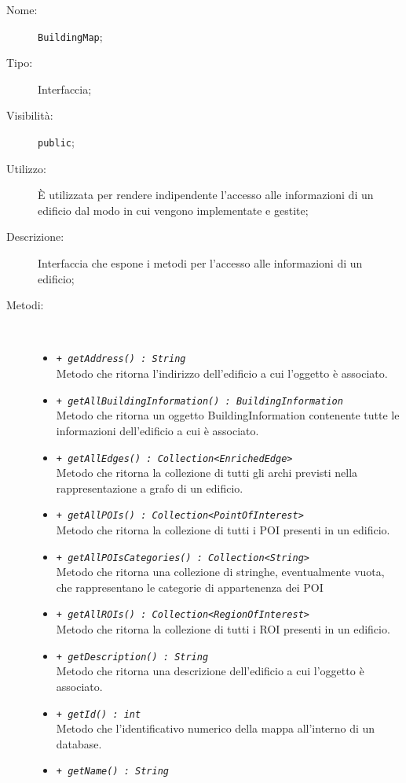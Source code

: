 \documentclass[../DefinizioneDiProdotto.tex]{subfiles}
\begin{document}
    \begin{description}
\item[Nome:] \texttt{BuildingMap};
\item[Tipo:] Interfaccia;
\item[Visibilità:] \texttt{public};
\item[Utilizzo:] È utilizzata per rendere indipendente l'accesso alle informazioni di un edificio dal modo in cui vengono implementate e gestite;
\item[Descrizione:] Interfaccia che espone i metodi per l'accesso alle informazioni di un edificio;
\item[Metodi:] \
\begin{itemize}
\item \texttt{+ \textit{getAddress() : String}}\\
Metodo che ritorna l'indirizzo dell'edificio a cui l'oggetto è associato.
 \item \texttt{+ \textit{getAllBuildingInformation() : BuildingInformation}}\\
Metodo che ritorna un oggetto BuildingInformation contenente tutte le informazioni dell'edificio a cui è associato.
 \item \texttt{+ \textit{getAllEdges() : Collection<EnrichedEdge>}}\\
Metodo che ritorna la collezione di tutti gli archi previsti nella rappresentazione a grafo di un edificio.
 \item \texttt{+ \textit{getAllPOIs() : Collection<PointOfInterest>}}\\
Metodo che ritorna la collezione di tutti i POI presenti in un edificio.
 \item \texttt{+ \textit{getAllPOIsCategories() : Collection<String>}}\\
Metodo che ritorna una collezione di stringhe, eventualmente vuota, che rappresentano le categorie di appartenenza dei POI
 \item \texttt{+ \textit{getAllROIs() : Collection<RegionOfInterest>}}\\
Metodo che ritorna la collezione di tutti i ROI presenti in un edificio.
 \item \texttt{+ \textit{getDescription() : String}}\\
Metodo che ritorna una descrizione dell'edificio a cui l'oggetto è associato.
 \item \texttt{+ \textit{getId() : int}}\\
Metodo che l'identificativo numerico della mappa all'interno di un database.
 \item \texttt{+ \textit{getName() : String}}\\

\end{itemize}
\end{description}
\end{document}
